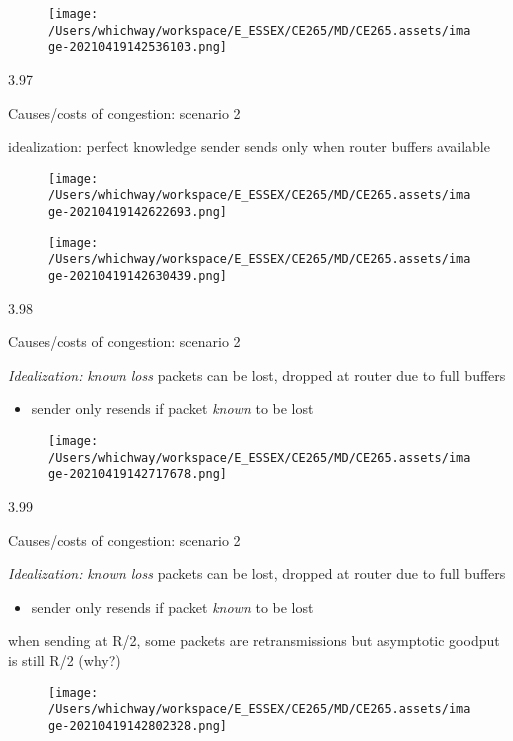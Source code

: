 \documentclass[
]{article}
\begin{document}
\begin{figure}
\centering
\texttt{[image: /Users/whichway/workspace/E\_ESSEX/CE265/MD/CE265.assets/image-20210419142536103.png]}
\caption{}
\end{figure}

3.97

Causes/costs of congestion: scenario 2

idealization: perfect knowledge sender sends only when router buffers
available

\begin{figure}
\centering
\texttt{[image: /Users/whichway/workspace/E\_ESSEX/CE265/MD/CE265.assets/image-20210419142622693.png]}
\caption{}
\end{figure}

\begin{figure}
\centering
\texttt{[image: /Users/whichway/workspace/E\_ESSEX/CE265/MD/CE265.assets/image-20210419142630439.png]}
\caption{}
\end{figure}

3.98

Causes/costs of congestion: scenario 2

\emph{Idealization:} \emph{known loss} packets can be lost, dropped at
router due to full buffers

\begin{itemize}
\item
  sender only resends if packet \emph{known} to be lost
\end{itemize}

\begin{figure}
\centering
\texttt{[image: /Users/whichway/workspace/E\_ESSEX/CE265/MD/CE265.assets/image-20210419142717678.png]}
\caption{}
\end{figure}

3.99

Causes/costs of congestion: scenario 2

\emph{Idealization:} \emph{known loss} packets can be lost, dropped at
router due to full buffers

\begin{itemize}
\item
  sender only resends if packet \emph{known} to be lost
\end{itemize}

when sending at R/2, some packets are retransmissions but asymptotic
goodput is still R/2 (why?)

\begin{figure}
\centering
\texttt{[image: /Users/whichway/workspace/E\_ESSEX/CE265/MD/CE265.assets/image-20210419142802328.png]}
\caption{}
\end{figure}
\end{document}
